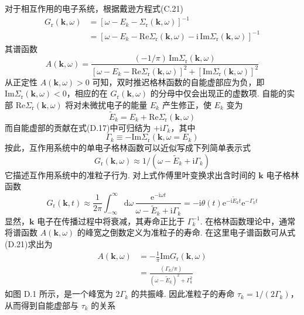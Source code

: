 对于相互作用的电子系统，根据戴逊方程式(C.21)
\begin{equation}
\begin{aligned}
G_{\mathrm{r}}(\boldsymbol{k},\omega)
&=[\omega-E_{k}-\Sigma_{\mathrm{r}}(\boldsymbol{k},\omega)]^{-1}\\
&=[\omega-E_{k}-\mathrm{Re}\Sigma_{\mathrm{r}}(\boldsymbol{k},\omega)
-\mathrm{i}\,\mathrm{Im}\Sigma_{\mathrm{r}}(\boldsymbol{k},\omega)]^{-1}
\end{aligned}
\end{equation}
其谱函数
\begin{equation}
A(\boldsymbol{k},\omega)=
\frac{(-1/\pi)\,\mathrm{Im}\Sigma_{\mathrm{r}}(\boldsymbol{k},\omega)}
{\left[\omega-E_{k}-\mathrm{Re}\Sigma_{\mathrm{r}}(\boldsymbol{k},\omega)\right]^{2}
+\left[\mathrm{Im}\Sigma_{\mathrm{r}}(\boldsymbol{k},\omega)\right]^{2}}
\end{equation}
从正定性 $A(\boldsymbol{k},\omega)>0$ 可知，双时推迟格林函数的自能虚部应为负，即 $\mathrm{Im}\Sigma_{\mathrm{r}}(\boldsymbol{k},\omega)<0$，相应的在 $G_{\mathrm{r}}(\boldsymbol{k},\omega)$ 的分母中仅会出现正的虚数项. 自能的实部 $\mathrm{Re}\Sigma_{\mathrm{r}}(\boldsymbol{k},\omega)$ 将对未微扰电子的能量 $E_{k}$ 产生修正，使 $E_{k}$ 变为
\begin{equation}
\widetilde{E}_{k}=E_{k}+\mathrm{Re}\Sigma_{\mathrm{r}}(\boldsymbol{k},\omega)
\end{equation}
而自能虚部的贡献在式(D.17)中可归结为 $+\mathrm{i}\Gamma_{k}$，其中
\begin{equation}
\Gamma_{k}\equiv-\mathrm{Im}\Sigma_{\mathrm{r}}
(\boldsymbol{k},\omega=E_{k})
\end{equation}
按此，互作用系统中的单电子格林函数可以近似写成下列简单表示式
\begin{equation}
G_{\mathrm{r}}(\boldsymbol{k},\omega)
\approx 1/(\omega-\widetilde{E}_{k}+\mathrm{i}\Gamma_{k})
\end{equation}
它描述互作用系统中的准粒子行为. 对上式作傅里叶变换求出含时间的 $\boldsymbol{k}$ 电子格林函数
\begin{equation}
G_{\mathrm{r}}(\boldsymbol{k},t)\approx\frac{1}{2\pi}
\int_{-\infty}^{\infty}\mathrm{d}\omega\,
\frac{\mathrm{e}^{-\mathrm{i}\omega t}}
{\omega-\widetilde{E}_{k}+\mathrm{i}\Gamma_{k}}
=-\mathrm{i}\theta(t)\mathrm{e}^{-\mathrm{i}\widetilde{E}_{k}t}
\mathrm{e}^{-\Gamma_{k}t}
\end{equation}
显然，$\boldsymbol{k}$ 电子在传播过程中将衰减，其寿命正比于
$\Gamma_{k}^{-1}$. 在格林函数理论中，通常将谱函数 $A(\boldsymbol{k},\omega)$ 的峰宽之倒数定义为准粒子的寿命. 在这里电子谱函数可从式(D.21)求出为
\begin{equation}
\begin{aligned}
A(\boldsymbol{k},\omega)&=-\frac{1}{\pi}
\mathrm{Im}G_{\mathrm{r}}(\boldsymbol{k},\omega)\\
&=\frac{\left(\Gamma_{k}/\pi\right)}
{\left(\omega-\widetilde{E}_{k}\right)^{2}+\Gamma_{k}^{2}}
\end{aligned}
\end{equation}
如图 D.1 所示，是一个峰宽为 $2\Gamma_{k}$ 的共振峰. 因此准粒子的寿命 $\tau_{k}=1/(2\Gamma_{k})$，从而得到自能虚部与 $\tau_{k}$ 的关系


